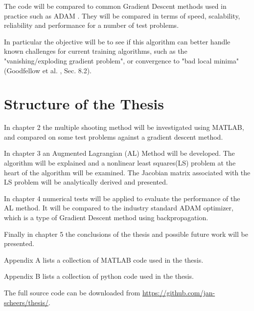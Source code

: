 The code will be compared to common Gradient Descent methods used in practice such as ADAM \cite{kingma2017adam}. They will be compared in terms of speed, scalability, reliability and performance for a number of test problems.

In particular the objective will be to see if this algorithm can better handle known challenges for current training algorithms, such as the "vanishing/exploding gradient problem", or convergence to "bad local minima" (Goodfellow et al. \cite{Goodfellow-et-al-2016}, Sec. 8.2).

\section{Structure of the Thesis}
In chapter 2 the multiple shooting method will be investigated using MATLAB, and compared on some test problems against a gradient descent method.

In chapter 3 an Augmented Lagrangian (AL) Method will be developed. The algorithm will be explained and a nonlinear least squares(LS) problem at the heart of the algorithm will be examined. The Jacobian matrix associated with the LS problem will be analytically derived and presented.

In chapter 4 numerical tests will be applied to evaluate the performance of the AL method. It will be compared to the industry standard ADAM optimizer, which is a type of Gradient Descent method using backpropagation.

Finally in chapter 5 the conclusions of the thesis and possible future work will be presented.

Appendix A lists a collection of MATLAB code used in the thesis.

Appendix B lists a collection of python code used in the thesis.

The full source code can be downloaded from \url{https://github.com/jan-scheers/thesis/}.



